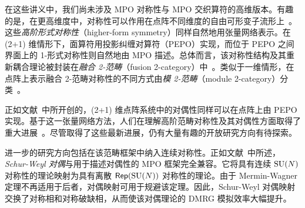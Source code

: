 在这些讲义中，我们尚未涉及 MPO 对称性与 MPO 交织算符的高维版本。有趣的是，在更高维度中，对称性可以作用在点阵不同维度的自由可形变子流形上~\cite{Batista2004,Nussinov2006,Nussinov2009,Gaiotto2014,Freed2022,Lin2022,Roumpedakis2022,McGreevy2022}。这些\emph{高阶形式对称性}（higher-form symmetry）同样自然地用张量网络表示。在 (2+1) 维情形下，面算符用投影纠缠对算符（PEPO）实现，而位于 PEPO 之间界面上的 1-形式对称性则自然地由 MPO 描述。总体而言，该对称性结构及其重新耦合理论被封装在\emph{融合 2-范畴}（fusion 2-category）中~\cite{Douglas2018,Decoppet2024}。类似于一维情形，在点阵上表示融合 2-范畴对称性的不同方式由\emph{模 2-范畴}（module 2-category）分类~\cite{Decoppet2021,Delcamp2021}。

正如文献~\cite{Haegeman2014a}中所开创的，(2+1) 维点阵系统中的对偶性同样可以在点阵上由 PEPO 实现。基于这一张量网络方法，人们在理解高阶范畴对称性及其对偶性方面取得了重大进展~\cite{Delcamp2021,Delcamp2023,Inamura2023,Inamura2025,Eck2025,Vancraeynest2024,Vancraeynest2025a}。尽管取得了这些最新进展，仍有大量有趣的开放研究方向有待探索。

进一步的研究方向包括在该范畴框架中纳入连续对称性。正如文献~\cite{Lootens2024}中所述，\emph{Schur-Weyl 对偶}与用于描述对偶性的 MPO 框架完全兼容。它将具有连续 ${\rm SU}(N)$ 对称性的理论映射为具有离散 $\mathsf{Rep}({\rm SU}(N))$ 对称性的理论。由于 Mermin-Wagner 定理不再适用于后者，对偶映射可用于规避该定理。因此，Schur-Weyl 对偶映射交换了对称相和对称破缺相，从而使该对偶理论的 DMRG 模拟效率大幅提升。